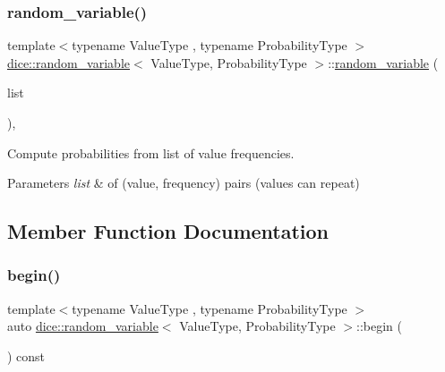 \subsubsection{\texorpdfstring{random\+\_\+variable()}{random\_variable()}\hspace{0.1cm}{\footnotesize\ttfamily [4/4]}}
{\footnotesize\ttfamily template$<$typename Value\+Type , typename Probability\+Type $>$ \\
\mbox{\hyperlink{classdice_1_1random__variable}{dice\+::random\+\_\+variable}}$<$ Value\+Type, Probability\+Type $>$\+::\mbox{\hyperlink{classdice_1_1random__variable}{random\+\_\+variable}} (\begin{DoxyParamCaption}\item[{const frequency\+\_\+list \&}]{list }\end{DoxyParamCaption})\hspace{0.3cm}{\ttfamily [inline]}, {\ttfamily [explicit]}}



Compute probabilities from list of value frequencies. 


\begin{DoxyParams}{Parameters}
{\em list} & of (value, frequency) pairs (values can repeat) \\
\hline
\end{DoxyParams}


\subsection{Member Function Documentation}
\mbox{\label{classdice_1_1random__variable_ad65ca036dd0c61483c888579b2d912fa}} 
\subsubsection{\texorpdfstring{begin()}{begin()}}
{\footnotesize\ttfamily template$<$typename Value\+Type , typename Probability\+Type $>$ \\
auto \mbox{\hyperlink{classdice_1_1random__variable}{dice\+::random\+\_\+variable}}$<$ Value\+Type, Probability\+Type $>$\+::begin (\begin{DoxyParamCaption}{ }\end{DoxyParamCaption}) const\hspace{0.3cm}{\ttfamily [inline]}}



